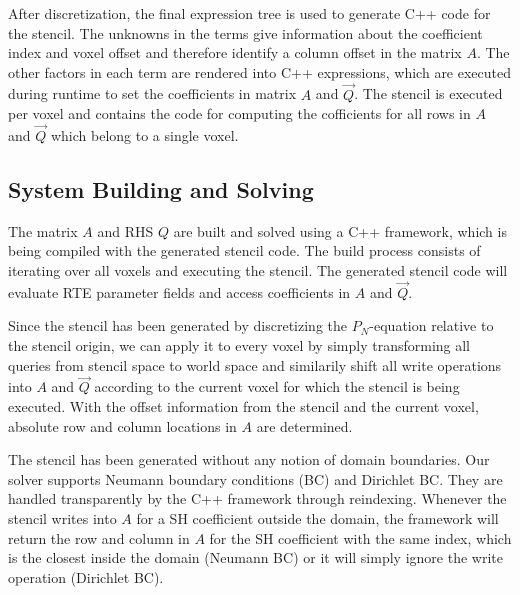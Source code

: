 \begin{figure}[h]
\centering
\begin{subfigure}{0.45\columnwidth}
\end{subfigure}%
\hspace{0.05\columnwidth}
\begin{subfigure}{0.45\columnwidth}
\end{subfigure}%
\label{fig:artefacts}
\end{figure}

After discretization, the final expression tree is used to generate C++ code for the stencil. The unknowns in the terms give information about the coefficient index and voxel offset and therefore identify a column offset in the matrix $A$. The other factors in each term are rendered into C++ expressions, which are executed during runtime to set the coefficients in matrix $A$ and $\vec{Q}$. The stencil is executed per voxel and contains the code for computing the cofficients for all rows in $A$ and $\vec{Q}$ which belong to a single voxel.

\subsection{System Building and Solving}

The matrix $A$ and RHS $Q$ are built and solved using a C++ framework, which is being compiled with the generated stencil code. The build process consists of iterating over all voxels and executing the stencil. The generated stencil code will evaluate RTE parameter fields and access coefficients in $A$ and $\vec{Q}$.

Since the stencil has been generated by discretizing the $P_N$-equation relative to the stencil origin, we can apply it to every voxel by simply transforming all queries from stencil space to world space and similarily shift all write operations into $A$ and $\vec{Q}$ according to the current voxel for which the stencil is being executed. With the offset information from the stencil and the current voxel, absolute row and column locations in $A$ are determined.

The stencil has been generated without any notion of domain boundaries. Our solver supports Neumann boundary conditions (BC) and Dirichlet BC. They are handled transparently by the C++ framework through reindexing. Whenever the stencil writes into $A$ for a SH coefficient outside the domain, the framework will return the row and column in $A$ for the SH coefficient with the same index, which is the closest inside the domain (Neumann BC) or it will simply ignore the write operation (Dirichlet BC).

